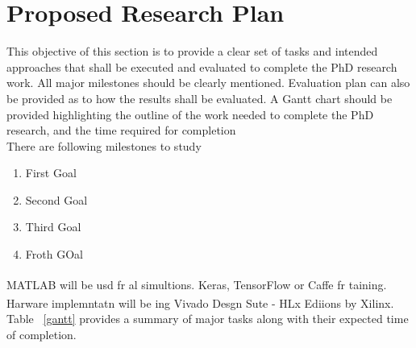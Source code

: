 \documentclass[letterpaper,12pt]{article}
\begin{document}
\section{Proposed Research Plan} \label{plan}
This objective of this section is to provide a clear set of tasks and intended approaches that shall be executed and evaluated to complete the PhD research work. All major milestones should be clearly mentioned. Evaluation plan can also be provided as to how the results shall be evaluated. A Gantt chart should be provided highlighting the outline of the work needed to complete the PhD research, and the time required for completion\\

There are following milestones to study
\begin{enumerate}
  \item First Goal
  \item Second Goal
  \item Third Goal
  \item Froth GOal
\end{enumerate}
MATLAB\textsuperscript{\tiny\textregistered} will be usd fr al simultions. Keras\textsuperscript{\tiny\textregistered}, TensorFlow\textsuperscript{\tiny\textregistered} or Caffe\textsuperscript{\tiny\textregistered}  fr taining. Harware implemntatn will be ing Vivado Desgn Sute - HLx Ediions by Xilinx\textsuperscript{\tiny\textregistered}.\\
Table ~\ref{gantt} provides a summary of major tasks along with their expected time of completion.
\end{document}

